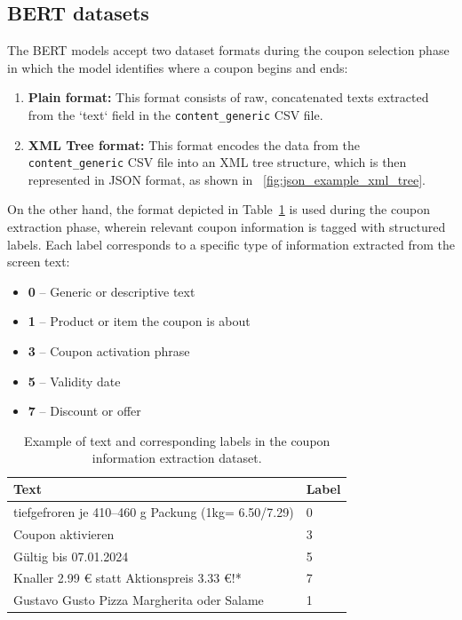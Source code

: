 \documentclass[licencjacka,en]{pracamgr}
\begin{document}
\subsection{BERT datasets}
The BERT models accept two dataset formats during the coupon selection phase in which the model identifies where a coupon begins and ends:

\begin{enumerate}
    \item \textbf{Plain format:} This format consists of raw, concatenated texts extracted from the `text` field in the \texttt{content\_generic} CSV file.
    \item \textbf{XML Tree format:} This format encodes the data from the \texttt{content\_generic} CSV file into an XML tree structure, which is then represented in JSON format, as shown in ~\ref{fig:json_example_xml_tree}.
\end{enumerate}

On the other hand, the format depicted in Table~\ref{tab:coupon_extraction_example} is used during the coupon extraction phase, wherein relevant coupon information is tagged with structured labels. Each label corresponds to a specific type of information extracted from the screen text:

\begin{itemize}
    \item \textbf{0} – Generic or descriptive text
    \item \textbf{1} – Product or item the coupon is about
    \item \textbf{3} – Coupon activation phrase
    \item \textbf{5} – Validity date
    \item \textbf{7} – Discount or offer
\end{itemize}

\begin{table}[h]
\centering
\begin{tabular}{|p{8cm}|p{2cm}|}
\hline
\textbf{Text} & \textbf{Label} \\
\hline
tiefgefroren je 410--460 g Packung (1kg= 6.50/7.29) & 0 \\
\hline
Coupon aktivieren & 3 \\
\hline
Gültig bis 07.01.2024 & 5 \\
\hline
Knaller 2.99 € statt Aktionspreis 3.33 €!* & 7 \\
\hline
Gustavo Gusto Pizza Margherita oder Salame & 1 \\
\hline
\end{tabular}
\caption{Example of text and corresponding labels in the coupon information extraction dataset.}
\label{tab:coupon_extraction_example}
\end{table}
\end{document}
